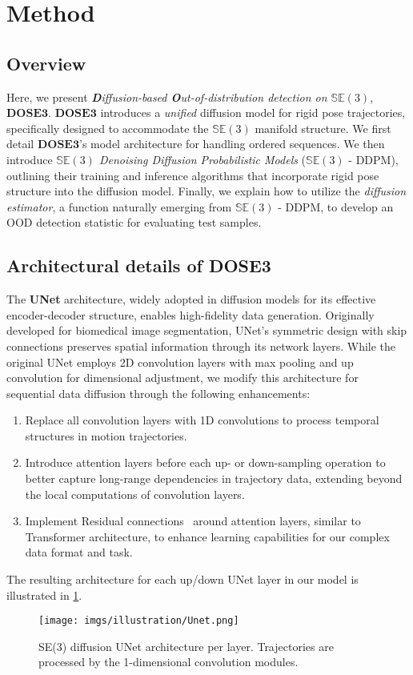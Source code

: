 \section{Method}
\subsection{Overview}
Here, we present \emph{\textbf{D}iffusion-based \textbf{O}ut-of-distribution detection on $\mathbb{SE}(3)$}, $\mathbf{DOSE3}$. $\mathbf{DOSE3}$ introduces a \emph{unified} diffusion model for rigid pose trajectories, specifically designed to accommodate the $\mathbb{SE}(3)$ manifold structure.
We first detail $\mathbf{DOSE3}$'s model architecture for handling ordered sequences. We then introduce \emph{$\mathbb{SE}(3)$ Denoising Diffusion Probabilistic Models} ($\mathbb{SE}(3)$ - DDPM), outlining their training and inference algorithms that incorporate rigid pose structure into the diffusion model. Finally, we explain how to utilize the \emph{diffusion estimator}, a function naturally emerging from $\mathbb{SE}(3)$ - DDPM, to develop an OOD detection statistic for evaluating test samples.
\subsection{Architectural details of DOSE3}
The \textbf{UNet} architecture, widely adopted in diffusion models for its effective encoder-decoder structure, enables high-fidelity data generation. Originally developed for biomedical image segmentation, UNet's symmetric design with skip connections preserves spatial information through its network layers. While the original UNet employs 2D convolution layers with max pooling and up convolution for dimensional adjustment, we modify this architecture for sequential data diffusion through the following enhancements:
\begin{enumerate}
\item Replace all convolution layers with 1D convolutions to process temporal structures in motion trajectories.
\item Introduce attention layers before each up- or down-sampling operation to better capture long-range dependencies in trajectory data, extending beyond the local computations of convolution layers.
\item Implement Residual connections~\citep{resnet} around attention layers, similar to Transformer architecture, to enhance learning capabilities for our complex data format and task.
\end{enumerate}
The resulting architecture for each up/down UNet layer in our model is illustrated in \cref{fig:unet}.
\begin{figure}[t]
    \centering
\texttt{[image: imgs/illustration/Unet.png]}
    \caption{SE(3) diffusion UNet architecture per layer. Trajectories are processed by the 1-dimensional convolution modules.}
    \label{fig:unet}
\end{figure}


